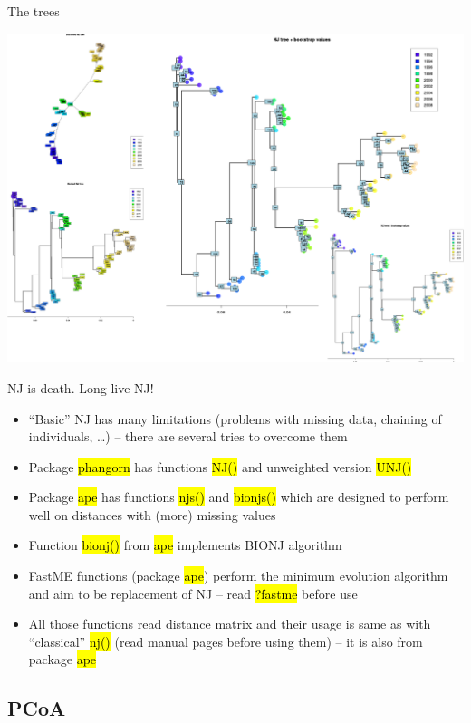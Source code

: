 \documentclass[compress, ucs, xelatex, 11pt, xcolor=svgnames,
  hyperref={
    bookmarks=true,
    unicode=true,
    colorlinks=true,
    pdftitle={Molecular data in R},
    plainpages=false,
    pdfauthor={Vojtech Zeisek},
    pdfsubject={Course about phylogeny and evolution in R},
    pdfcreator={XeLaTeX},
    pdfkeywords={R, evolution, phylogeny, molecular data},
    linkcolor=Tomato,
    anchorcolor=SaddleBrown,
    citecolor=Goldenrod,
    filecolor=DarkMagenta,
    menucolor=Sienna,
    urlcolor=DarkTurquoise,
    pdftex},
  url={hyphens, lowtilde} %
  ]{beamer}
\renewcommand{\texttt}[1]{\hl{\ttfamily #1}}
\begin{document}
\begin{frame}{The trees}
  \begin{center}
    \includegraphics[width=\textwidth-2.5cm]{nj_dna.png}
  \end{center}
\end{frame}

\begin{frame}{NJ is death. Long live NJ!}
  \begin{itemize}
  \item ``Basic'' NJ has many limitations (problems with missing data, chaining of individuals, \ldots) -- there are several tries to overcome them
  \item Package \texttt{phangorn} has functions \texttt{NJ()} and unweighted version \texttt{UNJ()}
  \item Package \texttt{ape} has functions \texttt{njs()} and \texttt{bionjs()} which are designed to perform well on distances with (more) missing values
  \item Function \texttt{bionj()} from \texttt{ape} implements BIONJ algorithm
  \item FastME functions (package \texttt{ape}) perform the minimum evolution algorithm and aim to be replacement of NJ -- read \texttt{?fastme} before use
  \item All those functions read distance matrix and their usage is same as with ``classical'' \texttt{nj()} (read manual pages before using them) -- it is also from package \texttt{ape}
  \end{itemize}
\end{frame}

\subsection{PCoA}
\end{document}
